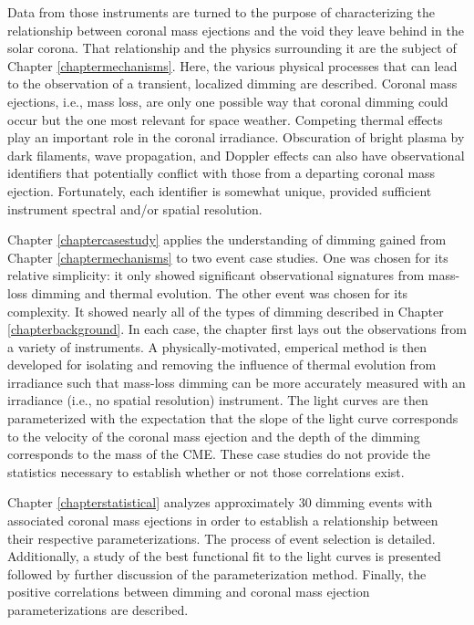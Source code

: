 Data from those instruments are turned to the purpose of characterizing the relationship between coronal mass ejections and the void they leave behind in the solar corona. That relationship and the physics surrounding it are the subject of Chapter \ref{chaptermechanisms}. Here, the various physical processes that can lead to the observation of a transient, localized dimming are described. Coronal mass ejections, i.e., mass loss, are only one possible way that coronal dimming could occur but the one most relevant for space weather. Competing thermal effects play an important role in the coronal irradiance. Obscuration of bright plasma by dark filaments, wave propagation, and Doppler effects can also have observational identifiers that potentially conflict with those from a departing coronal mass ejection. Fortunately, each identifier is somewhat unique, provided sufficient instrument spectral and/or spatial resolution. 

Chapter \ref{chaptercasestudy} applies the understanding of dimming gained from Chapter \ref{chaptermechanisms} to two event case studies. One was chosen for its relative simplicity: it only showed significant observational signatures from mass-loss dimming and thermal evolution. The other event was chosen for its complexity. It showed nearly all of the types of dimming described in Chapter \ref{chapterbackground}. In each case, the chapter first lays out the observations from a variety of instruments. A physically-motivated, emperical method is then developed for isolating and removing the influence of thermal evolution from irradiance such that mass-loss dimming can be more accurately measured with an irradiance (i.e., no spatial resolution) instrument. The light curves are then parameterized with the expectation that the slope of the light curve corresponds to the velocity of the coronal mass ejection and the depth of the dimming corresponds to the mass of the CME. These case studies do not provide the statistics necessary to establish whether or not those correlations exist. 

Chapter \ref{chapterstatistical} analyzes approximately 30 dimming events with associated coronal mass ejections in order to establish a relationship between their respective parameterizations. The process of event selection is detailed. Additionally, a study of the best functional fit to the light curves is presented followed by further discussion of the parameterization method. Finally, the positive correlations between dimming and coronal mass ejection parameterizations are described. 

